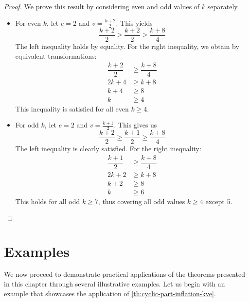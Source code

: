 \documentclass[12pt, twoside]{book}
\begin{document}
\begin{proof}
	We prove this result by considering even and odd values of $k$ separately.
	\begin{itemize}
		\item For even $k$, let $e=2$ and $v=\frac{k+2}{2}$. This yields
		$$\dfrac{k+2}{2}\geq \dfrac{k+2}{2}\geq \dfrac{k+8}{4}$$
		The left inequality holds by equality. For the right inequality, we obtain by equivalent transformations:
		\begin{align*}
			\dfrac{k+2}{2}&\geq \dfrac{k+8}{4} \\
			2k+4&\geq k+8 \\
			k+4&\geq 8 \\
			k&\geq 4
		\end{align*}
		This inequality is satisfied for all even $k\geq 4$.
		
		\item For odd $k$, let $e=2$ and $v=\frac{k+1}{2}$. This gives us
		$$\dfrac{k+2}{2}\geq \dfrac{k+1}{2}\geq \dfrac{k+8}{4}$$
		The left inequality is clearly satisfied. For the right inequality:
		\begin{align*}
			\dfrac{k+1}{2}&\geq \dfrac{k+8}{4} \\
			2k+2&\geq k+8 \\
			k+2&\geq 8 \\
			k&\geq 6
		\end{align*}
		This holds for all odd $k\geq 7$, thus covering all odd values $k\geq 4$ except 5.
	\end{itemize}
\end{proof}

\section{Examples}

We now proceed to demonstrate practical applications of the theorems presented in this chapter through several illustrative examples. Let us begin with an example that showcases the application of \cref{th:cyclic-part-inflation-kve}.
\end{document}
